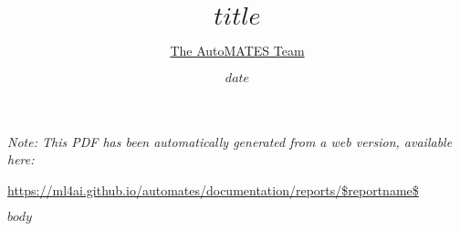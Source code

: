 \documentclass[article, 12pt, oneside]{memoir}
\title{$title$}
\author{\href{https://ml4ai.github.io/automates/team/}{The AutoMATES Team}}
\date{$date$}
\begin{document}
\maketitle
\tableofcontents*

\bigskip
\bigskip

\noindent \emph{Note: This PDF has been automatically generated from a web
  version, available here:}

  {
  \small
\noindent \url{https://ml4ai.github.io/automates/documentation/reports/$reportname$}
}

$body$
\end{document}
